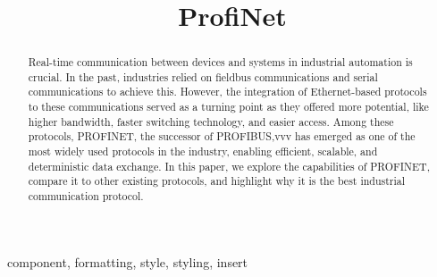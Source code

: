 \documentclass[conference]{IEEEtran}
\begin{document}
\title{ProfiNet\\}

\author{
\and
{}
\and
{}
}

\maketitle

\begin{abstract}
Real-time communication between devices and systems in industrial automation is crucial. In the past, industries relied on fieldbus communications and serial communications to achieve this. However, the integration of Ethernet-based protocols to these communications served as a turning point as they offered more potential, like higher bandwidth, faster switching technology, and easier access. Among these protocols, PROFINET, the successor of PROFIBUS,vvv has emerged as one of the most widely used protocols in the industry, enabling efficient, scalable, and deterministic data exchange. In this paper, we explore the capabilities of PROFINET, compare it to other existing protocols, and highlight why it is the best industrial communication protocol.

\end{abstract}

\begin{IEEEkeywords}
component, formatting, style, styling, insert
\end{IEEEkeywords}
\end{document}
